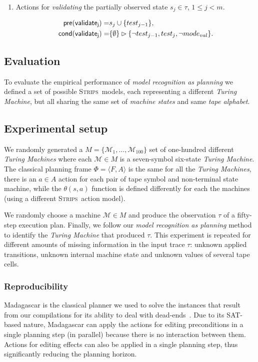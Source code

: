 \documentclass[letterpaper]{article} %
\newcommand{\tup}[1]{{\langle #1 \rangle}}
\newcommand{\pre}{\mathsf{pre}}     %
\newcommand{\cond}{\mathsf{cond}}   %
\newcommand{\strips}{\textsc{Strips}}     %
\begin{document}
\begin{itemize}
\begin{enumerate}
\item Actions for {\em validating} the partially observed state $s_j\in\tau$, {\tt\small $1\leq j< m$}.
\begin{small}
\begin{align*}
\hspace*{7pt}\pre(\mathsf{validate_{j}})=&s_j\cup\{test_{j-1}\},\\
\cond(\mathsf{validate_{j}})=&\{\emptyset\}\rhd\{\neg test_{j-1}, test_j,\neg mode_{val}\}.
\end{align*}
\end{small}
\end{enumerate}
\end{itemize}


\subsection{Evaluation}
\label{sec:evaluation}
To evaluate the empirical performance of {\em model recognition as planning} we defined a set of possible \strips\ models, each representing a different {\em Turing Machine}, but all sharing the same set of {\em machine states} and same {\em tape alphabet}.






\subsection{Experimental setup}
We randomly generated a $M=\{\mathcal{M}_1,\ldots,\mathcal{M}_{100}\}$ set of one-hundred different {\em Turing Machines} where each $\mathcal{M}\in M$ is a seven-symbol six-state {\em Turing Machine}. The classical planning frame $\Phi=\tup{F,A}$ is the same for all the {\em Turing Machines}, there is an $a\in A$ action for each pair of tape symbol and non-terminal state machine, while the $\theta(s,a)$ function is defined differently for each the machines (using a different \strips\ action model).

We randomly choose a machine $\mathcal{M}\in M$ and produce the observation $\tau$ of a fifty-step execution plan. Finally, we follow our {\em model recognition as planning} method to identify the {\em Turing Machine} that produced $\tau$. This experiment is repeated for different amounts of missing information in the input trace $\tau$: unknown applied transitions, unknown internal machine state and unknown values of several tape cells.

\subsubsection{Reproducibility}
{\sc Madagascar} is the classical planner we used to solve the instances that result from our compilations for its ability to deal with dead-ends~\cite{rintanen2014madagascar}. Due to its SAT-based nature, {\sc Madagascar} can apply the actions for editing preconditions in a single planning step (in parallel) because there is no interaction between them. Actions for editing effects can also be applied in a single planning step, thus significantly reducing the planning horizon.
\end{document}
